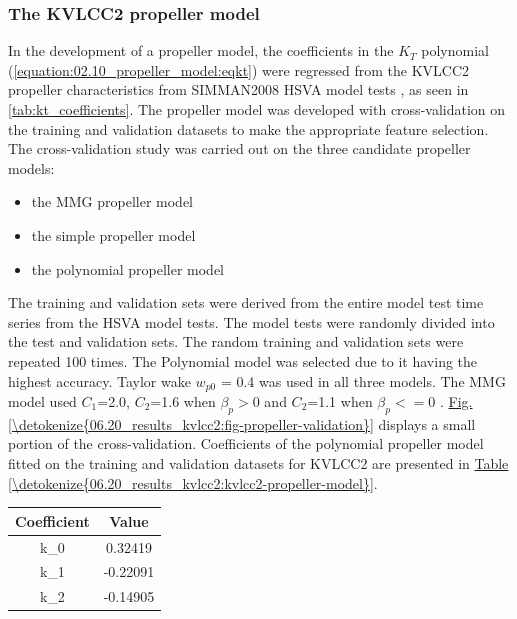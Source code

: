 \subsubsection{The KVLCC2 propeller model}
\label{\detokenize{06.20_results_kvlcc2:the-kvlcc2-propeller-model}}\label{\detokenize{06.20_results_kvlcc2:results-propeller-model}}

In the development of a propeller model, the coefficients in the \(K_T\) polynomial (\autoref{equation:02.10_propeller_model:eqkt}) were regressed from the KVLCC2 propeller characteristics from SIMMAN2008 HSVA model tests \cite{stern_experience_2011}, as seen in \autoref{tab:kt_coefficients}. The propeller model was developed with cross-validation on the training and validation datasets to make the appropriate feature selection.
The cross-validation study was carried out on the three candidate propeller models: 
\begin{itemize}
    \item the MMG propeller model
    \item the simple propeller model
    \item the polynomial propeller model
\end{itemize}
The training and validation sets were derived from the entire model test time series from the HSVA model tests. The model tests were randomly divided into the test and validation sets. The random training and validation sets were repeated 100 times. The Polynomial model was selected due to it having the highest accuracy. Taylor wake \(w_{p0}\) = {0.4} was used in all three models. The MMG model used \(C_1\)={2.0}, \(C_2\)={1.6} when \(\beta_p>0\) and \(C_2\)={1.1} when \(\beta_p<=0\) \cite{yasukawa_introduction_2015-1}. \hyperref[\detokenize{06.20_results_kvlcc2:fig-propeller-validation}]{Fig.\@ \ref{\detokenize{06.20_results_kvlcc2:fig-propeller-validation}}} displays a small portion of the cross-validation. Coefficients of the polynomial propeller model fitted on the training and validation datasets for KVLCC2 are presented in \hyperref[\detokenize{06.20_results_kvlcc2:kvlcc2-propeller-model}]{Table \ref{\detokenize{06.20_results_kvlcc2:kvlcc2-propeller-model}}}.
\begin{minipage}[c]{0.49\textwidth}
    \vspace{-0.40cm}
    \centering
    \label{tab:kt_coefficients}
    \begin{tabular}{c c}
        \toprule
        Coefficient & Value \\
        \hline
        k_0 & 0.32419 \\
        k_1 & -0.22091 \\
        k_2 & -0.14905 \\
        \bottomrule
    \end{tabular}

\end{minipage}

